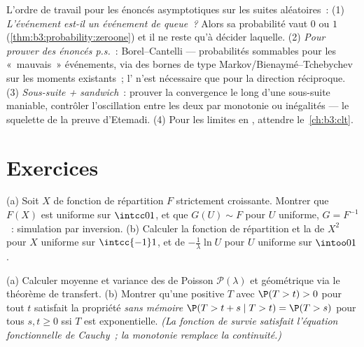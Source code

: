 \begin{method}\label{met:b3:probability:toolkit}
L'ordre de travail pour les énoncés asymptotiques sur les
suites aléatoires~: (1) \emph{L'événement est-il un
événement de queue~?} Alors sa probabilité vaut $0$ ou $1$
(\cref{thm:b3:probability:zeroone}) et il ne reste qu'à
décider laquelle. (2) \emph{Pour prouver des énoncés
p.s.}~: Borel--Cantelli --- probabilités sommables pour les
«~mauvais~» événements, via des bornes de type
Markov/Bienaymé--Tchebychev sur les moments existants~;
l' n'est nécessaire que pour la direction
réciproque. (3) \emph{Sous-suite + sandwich}~: prouver la
convergence le long d'une sous-suite maniable, contrôler
l'oscillation entre les deux par monotonie ou inégalités
 --- le squelette de la preuve d'Etemadi. (4) Pour
les limites en , attendre le~\cref{ch:b3:clt}.
\end{method}

\section{Exercices}

\begin{exercise}[$\star$]\label{exo:b3:probability:1}
(a) Soit $X$ de fonction de répartition $F$ 
strictement croissante. Montrer que $F(X)$ est uniforme sur
$\intcc01$, et que $G(U) \sim F$ pour $U$ uniforme, $G =
F^{-1}$~: simulation par inversion.
(b) Calculer la fonction de répartition et la  de
$X^2$ pour $X$ uniforme sur $\intcc{-1}1$, et de
$-\frac1\lambda\ln U$ pour $U$ uniforme sur $\intoo01$.
\end{exercise}

\begin{exercise}[$\star$]\label{exo:b3:probability:2}
(a) Calculer moyenne et variance des  de Poisson
$\mathcal P(\lambda)$ et géométrique via le théorème de
transfert.
(b) Montrer qu'une  positive $T$ avec
$\P(T > t) > 0$ pour tout $t$ satisfait la propriété
\emph{sans mémoire} $\P(T > t + s \mid T > t) = \P(T > s)$
pour tous $s, t \geq 0$ ssi $T$ est exponentielle. \emph{(La
fonction de survie satisfait l'équation fonctionnelle de
Cauchy~; la monotonie remplace la continuité.)}
\end{exercise}

